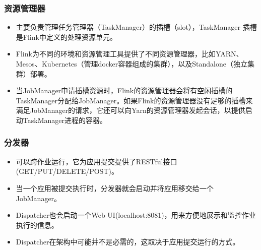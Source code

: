 \documentclass{beamer}
\begin{document}
  \begin{frame}
      \frametitle{资源管理器}
  
      \begin{itemize}
          \item 主要负责管理任务管理器（TaskManager）的插槽（slot），TaskManager 插槽是Flink中定义的处理资源单元。
          \item Flink为不同的环境和资源管理工具提供了不同资源管理器，比如YARN、Mesos、Kubernetes（管理docker容器组成的集群），以及Standalone（独立集群）部署。
          \item 当JobManager申请插槽资源时，Flink的资源管理器会将有空闲插槽的TaskManager分配给JobManager。如果Flink的资源管理器没有足够的插槽来满足JobManager的请求，它还可以向Yarn的资源管理器发起会话，以提供启动TaskManager进程的容器。
      \end{itemize}
  
  \end{frame}

  \begin{frame}
      \frametitle{分发器}
  
      \begin{itemize}
          \item 可以跨作业运行，它为应用提交提供了RESTful接口(GET/PUT/DELETE/POST)。
          \item 当一个应用被提交执行时，分发器就会启动并将应用移交给一个JobManager。
          \item Dispatcher也会启动一个Web UI(localhost:8081)，用来方便地展示和监控作业执行的信息。
          \item Dispatcher在架构中可能并不是必需的，这取决于应用提交运行的方式。
      \end{itemize}
  
  \end{frame}
\end{document}

